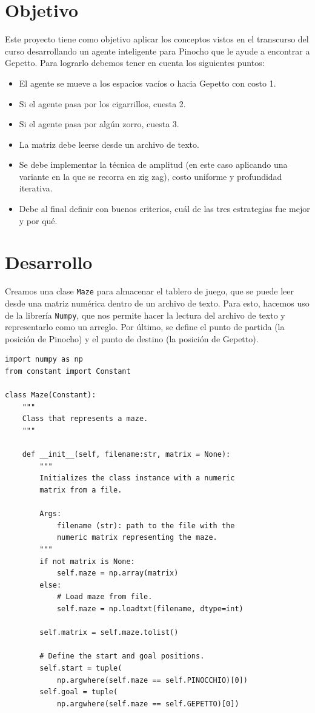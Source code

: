 \documentclass[12pt, letterpaper]{article}
\begin{document}
\section{Objetivo}
Este proyecto tiene como objetivo aplicar los conceptos vistos en el transcurso del curso desarrollando un agente inteligente para Pinocho que le ayude a encontrar a Gepetto. Para lograrlo debemos tener en cuenta los siguientes puntos:
\begin{itemize}
    \item El agente se mueve a los espacios vacíos o hacia Gepetto con costo 1.
    \item Si el agente pasa por los cigarrillos, cuesta 2.
    \item Si el agente pasa por algún zorro, cuesta 3.
    \item La matriz debe leerse desde un archivo de texto.
    \item Se debe implementar la técnica de amplitud (en este caso aplicando una variante en la que se recorra en zig zag), costo uniforme y profundidad iterativa.
    \item Debe al final definir con buenos criterios, cuál de las tres estrategias fue mejor y por qué.
\end{itemize}
\clearpage
\section{Desarrollo}
Creamos una clase \lstinline{Maze} para almacenar el tablero de juego, que se puede leer desde una matriz numérica dentro de un archivo de texto. Para esto, hacemos uso de la librería \lstinline{Numpy}, que nos permite hacer la lectura del archivo de texto y representarlo como un arreglo. Por último, se define el punto de partida (la posición de Pinocho) y el punto de destino (la posición de Gepetto).\\
\begin{lstlisting}
import numpy as np
from constant import Constant

class Maze(Constant):
    """
    Class that represents a maze.
    """

    def __init__(self, filename:str, matrix = None):
        """
        Initializes the class instance with a numeric
        matrix from a file.

        Args:
            filename (str): path to the file with the
            numeric matrix representing the maze.
        """
        if not matrix is None:
            self.maze = np.array(matrix)
        else:
            # Load maze from file.
            self.maze = np.loadtxt(filename, dtype=int)
            
        self.matrix = self.maze.tolist()

        # Define the start and goal positions.
        self.start = tuple(
            np.argwhere(self.maze == self.PINOCCHIO)[0])
        self.goal = tuple(
            np.argwhere(self.maze == self.GEPETTO)[0])
\end{lstlisting}
\end{document}
